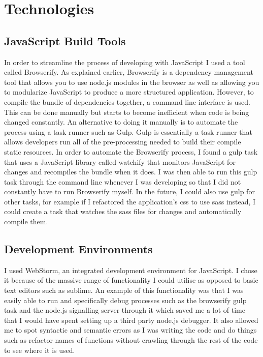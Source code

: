 \documentclass[]{report}
\begin{document}
		\section{Technologies}
			\subsection{JavaScript Build Tools}
			In order to streamline the process of developing with JavaScript I used a tool called Browserify. As explained earlier, Browserify is a dependency management tool that allows you to use node.js modules in the browser as well as allowing you to modularize JavaScript to produce a more structured application. However, to compile the bundle of dependencies together, a command line interface is used. This can be done manually but starts to become inefficient when code is being changed constantly. An alternative to doing it manually is to automate the process using a task runner such as Gulp. Gulp is essentially a task runner that allows developers run all of the pre-processing needed to build their compile static resources. In order to automate the Browserify process, I found a gulp task that uses a JavaScript library called watchify that monitors JavaScript for changes and recompiles the bundle when it does. I was then able to run this gulp task through the command line whenever I was developing so that I did not constantly have to run Browserify myself. In the future, I could also use gulp for other tasks, for example if I refactored the application's css to use sass instead, I could create a task that watches the sass files for changes and automatically compile them.
			
			\subsection{Development Environments}
			I used WebStorm, an integrated development environment for JavaScript. I chose it because of the massive range of functionality I could utilise as opposed to basic text editors such as sublime. An example of this functionality was that I was easily able to run and specifically debug processes such as the browserify gulp task and the node.js signalling server through it which saved me a lot of time that I would have spent setting up a third party node.js debugger. It also allowed me to spot syntactic and semantic errors as I was writing the code and do things such as refactor names of functions without crawling through the rest of the code to see where it is used.
			
\end{document}
